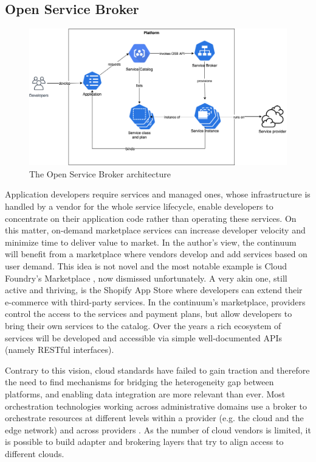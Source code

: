 \subsection{Open Service Broker}
\label{sec:osb}

\begin{figure}[h]
\centering
\includegraphics[width=\columnwidth]{figures/osb}
\caption{The Open Service Broker architecture \label{fig:osb}}
\end{figure}

Application developers require services and managed ones, whose infrastructure is handled by a vendor for the whole service lifecycle, enable developers to concentrate on their application code rather than operating these services. On this matter, on-demand marketplace services can increase developer velocity and minimize time to deliver value to market. In the author's view, the continuum will benefit from a marketplace where vendors develop and add services based on user demand. This idea is not novel and the most notable example is Cloud Foundry's Marketplace \cite{cloud-foundry-marketplace}, now dismissed unfortunately. A very akin one, still active and thriving, is the Shopify App Store \cite{shopify} where developers can extend their e-commerce with third-party services. In the continuum's marketplace, providers control the access to the services and payment plans, but allow developers to bring their own services to the catalog. Over the years a rich ecosystem of services will be developed and accessible via simple well-documented APIs (namely RESTful interfaces).

Contrary to this vision, cloud standards have failed to gain traction and therefore the need to find mechanisms for bridging the heterogeneity gap between platforms, and enabling data integration are more relevant than ever. Most orchestration technologies working across administrative domains use a broker to orchestrate resources at different levels within a provider (e.g. the cloud and the edge network) and across providers \cite{inter-cloud}. As the number of cloud vendors is limited, it is possible to build adapter and brokering layers that try to align access to different clouds. 

